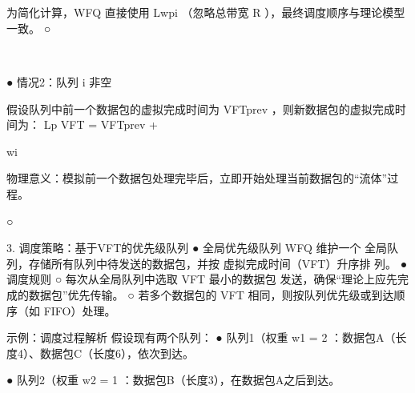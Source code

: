                                                                                                                                           ​
                                                                                                                                                  ​




                                                                                                                                                      ​




     为简化计算，WFQ 直接使用 Lwpi （忽略总带宽 R ），最终调度顺序与理论模型一致。
     ○
                                                                      ​




                                                                          ​




 ● 情况2：队列 i 非空
                                                                  ​




   假设队列中前一个数据包的虚拟完成时间为 VFTprev ，则新数据包的虚拟完成时间为：
                                     Lp
     VFT = VFTprev +
                                              ​




                                     wi
                                                  ​




         物理意义：模拟前一个数据包处理完毕后，立即开始处理当前数据包的“流体”过程。
                                          ​




     ○


3. 调度策略：基于VFT的优先级队列
 ● 全局优先级队列
   WFQ 维护一个 全局队列，存储所有队列中待发送的数据包，并按 虚拟完成时间（VFT）升序排
   列。
 ● 调度规则
    ○ 每次从全局队列中选取 VFT 最小的数据包 发送，确保“理论上应先完成的数据包”优先传输。
    ○ 若多个数据包的 VFT 相同，则按队列优先级或到达顺序（如 FIFO）处理。


示例：调度过程解析
假设现有两个队列：
 ● 队列1（权重 w1 = 2 ：数据包A（长度4）、数据包C（长度6），依次到达。
                             ​




 ● 队列2（权重 w2 = 1 ：数据包B（长度3），在数据包A之后到达。
                                 ​




